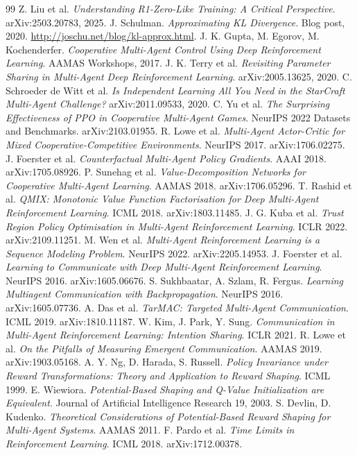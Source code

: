 \documentclass[11pt,a4paper]{article}
\begin{document}
\begin{thebibliography}{99}
 Z. Liu et al. \emph{Understanding R1-Zero-Like Training: A Critical Perspective}. arXiv:2503.20783, 2025.
 J. Schulman. \emph{Approximating KL Divergence}. Blog post, 2020. \url{http://joschu.net/blog/kl-approx.html}.
 J. K. Gupta, M. Egorov, M. Kochenderfer. \emph{Cooperative Multi-Agent Control Using Deep Reinforcement Learning}. AAMAS Workshops, 2017.
 J. K. Terry et al. \emph{Revisiting Parameter Sharing in Multi-Agent Deep Reinforcement Learning}. arXiv:2005.13625, 2020.
 C. Schroeder de Witt et al. \emph{Is Independent Learning All You Need in the StarCraft Multi-Agent Challenge?} arXiv:2011.09533, 2020.
 C. Yu et al. \emph{The Surprising Effectiveness of PPO in Cooperative Multi-Agent Games}. NeurIPS 2022 Datasets and Benchmarks. arXiv:2103.01955.
 R. Lowe et al. \emph{Multi-Agent Actor-Critic for Mixed Cooperative-Competitive Environments}. NeurIPS 2017. arXiv:1706.02275.
 J. Foerster et al. \emph{Counterfactual Multi-Agent Policy Gradients}. AAAI 2018. arXiv:1705.08926.
 P. Sunehag et al. \emph{Value-Decomposition Networks for Cooperative Multi-Agent Learning}. AAMAS 2018. arXiv:1706.05296.
 T. Rashid et al. \emph{QMIX: Monotonic Value Function Factorisation for Deep Multi-Agent Reinforcement Learning}. ICML 2018. arXiv:1803.11485.
 J. G. Kuba et al. \emph{Trust Region Policy Optimisation in Multi-Agent Reinforcement Learning}. ICLR 2022. arXiv:2109.11251.
 M. Wen et al. \emph{Multi-Agent Reinforcement Learning is a Sequence Modeling Problem}. NeurIPS 2022. arXiv:2205.14953.
 J. Foerster et al. \emph{Learning to Communicate with Deep Multi-Agent Reinforcement Learning}. NeurIPS 2016. arXiv:1605.06676.
 S. Sukhbaatar, A. Szlam, R. Fergus. \emph{Learning Multiagent Communication with Backpropagation}. NeurIPS 2016. arXiv:1605.07736.
 A. Das et al. \emph{TarMAC: Targeted Multi-Agent Communication}. ICML 2019. arXiv:1810.11187.
 W. Kim, J. Park, Y. Sung. \emph{Communication in Multi-Agent Reinforcement Learning: Intention Sharing}. ICLR 2021.
 R. Lowe et al. \emph{On the Pitfalls of Measuring Emergent Communication}. AAMAS 2019. arXiv:1903.05168.
 A. Y. Ng, D. Harada, S. Russell. \emph{Policy Invariance under Reward Transformations: Theory and Application to Reward Shaping}. ICML 1999.
 E. Wiewiora. \emph{Potential-Based Shaping and Q-Value Initialization are Equivalent}. Journal of Artificial Intelligence Research 19, 2003.
 S. Devlin, D. Kudenko. \emph{Theoretical Considerations of Potential-Based Reward Shaping for Multi-Agent Systems}. AAMAS 2011.
 F. Pardo et al. \emph{Time Limits in Reinforcement Learning}. ICML 2018. arXiv:1712.00378.
\end{thebibliography}
\endgroup
\end{document}

